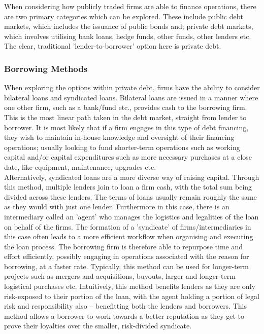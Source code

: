 \documentclass[11pt, english]{article}
\begin{document}
	When considering how publicly traded firms are able to finance operations, there are two primary categories which can be explored. These include public debt markets, which includes the issuance of public bonds and; private debt markets, which involves utilising bank loans, hedge funds, other funds, other lenders etc. The clear, traditional 'lender-to-borrower' option here is private debt.

		\subsubsection*{Borrowing Methods}

	When exploring the options within private debt, firms have the ability to consider bilateral loans and syndicated loans. Bilateral loans are issued in a manner where one other firm, such as a bank/fund etc., provides cash to the borrowing firm. This is the most linear path taken in the debt market, straight from lender to borrower. It is most likely that if a firm engages in this type of debt financing, they wish to maintain in-house knowledge and oversight of their financing operations; usually looking to fund shorter-term operations such as working capital and/or capital expenditures such as more necessary purchases at a close date, like equipment, maintenance, upgrades etc.\\

	Alternatively, syndicated loans are a more diverse way of raising capital. Through this method, multiple lenders join to loan a firm cash, with the total sum being divided across these lenders. The terms of loans usually remain roughly the same as they would with just one lender. Furthermore in this case, there is an intermediary called an 'agent' who manages the logistics and legalities of the loan on behalf of the firms. The formation of a 'syndicate' of firms/intermediaries in this case often leads to a more efficient workflow when organising and executing the loan process. The borrowing firm is therefore able to repurpose time and effort efficiently, possibly engaging in operations associated with the reason for borrowing, at a faster rate. Typically, this method can be used for longer-term projects such as mergers and acquisitions, buyouts, larger and longer-term logistical purchases etc. Intuitively, this method benefits lenders as they are only risk-exposed to their portion of the loan, with the agent holding a portion of legal risk and responsibility also – benefitting both the lenders and borrowers. This method allows a borrower to work towards a better reputation as they get to prove their loyalties over the smaller, risk-divided syndicate.\\
\end{document}
